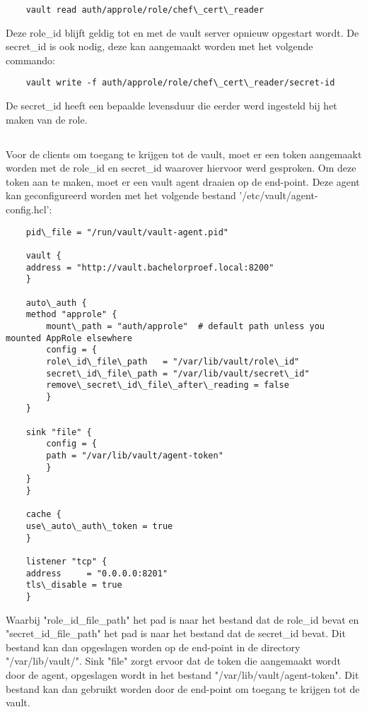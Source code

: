 \begin{verbatim}
    vault read auth/approle/role/chef\_cert\_reader
\end{verbatim}

Deze role\_id blijft geldig tot en met de vault server opnieuw opgestart wordt. De secret\_id is ook nodig, deze kan aangemaakt worden met het volgende commando:
\begin{verbatim}
    vault write -f auth/approle/role/chef\_cert\_reader/secret-id
\end{verbatim}
De secret\_id heeft een bepaalde levensduur die eerder werd ingesteld bij het maken van de role.

\subsection{}
\label{subsec:Installeren_van_een_Vault_agent}

Voor de clients om toegang te krijgen tot de vault, moet er een token aangemaakt worden met de role\_id en secret\_id waarover hiervoor werd gesproken. Om deze token aan te maken, moet er een vault agent draaien op de end-point.
Deze agent kan geconfigureerd worden met het volgende bestand '/etc/vault/agent-config.hcl':

\begin{verbatim}
    pid\_file = "/run/vault/vault-agent.pid"

    vault {
    address = "http://vault.bachelorproef.local:8200"
    }

    auto\_auth {
    method "approle" {
        mount\_path = "auth/approle"  # default path unless you mounted AppRole elsewhere
        config = {
        role\_id\_file\_path   = "/var/lib/vault/role\_id"
        secret\_id\_file\_path = "/var/lib/vault/secret\_id"
        remove\_secret\_id\_file\_after\_reading = false
        }
    }

    sink "file" {
        config = {
        path = "/var/lib/vault/agent-token"
        }
    }
    }

    cache {
    use\_auto\_auth\_token = true
    }

    listener "tcp" {
    address     = "0.0.0.0:8201"
    tls\_disable = true
    }
\end{verbatim}

Waarbij "role\_id\_file\_path" het pad is naar het bestand dat de role\_id bevat en "secret\_id\_file\_path" het pad is naar het bestand dat de secret\_id bevat. Dit bestand kan dan opgeslagen worden op de end-point in de directory "/var/lib/vault/". 
Sink "file" zorgt ervoor dat de token die aangemaakt wordt door de agent, opgeslagen wordt in het bestand "/var/lib/vault/agent-token". Dit bestand kan dan gebruikt worden door de end-point om toegang te krijgen tot de vault. \\

